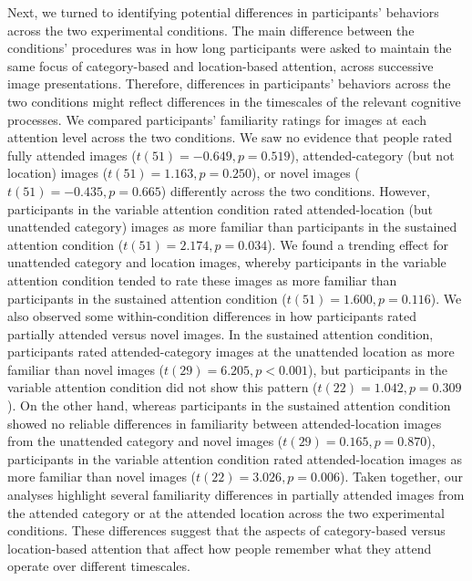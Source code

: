 \documentclass[english]{article}
\begin{document}
Next, we turned to identifying potential differences in participants' behaviors
across the two experimental conditions. The main difference between the
conditions' procedures was in how long participants were asked to maintain the
same focus of category-based and location-based attention, across successive
image presentations. Therefore, differences in participants' behaviors across
the two conditions might reflect differences in the timescales of the relevant
cognitive processes. We compared participants' familiarity ratings for images
at each attention level across the two conditions. We saw no evidence that
people rated fully attended images ($t(51) = -0.649, p = 0.519$),
attended-category (but not location) images ($t(51) = 1.163, p = 0.250$), or
novel images ($t(51) = -0.435, p = 0.665$) differently across the two
conditions. However, participants in the variable attention condition rated
attended-location (but unattended category) images as more familiar than
participants in the sustained attention condition ($t(51) = 2.174, p = 0.034$).
We found a trending effect for unattended category and location images, whereby
participants in the variable attention condition tended to rate these images as
more familiar than participants in the sustained attention condition ($t(51) =
1.600, p = 0.116$). We also observed some within-condition differences in how
participants rated partially attended versus novel images. In the sustained
attention condition, participants rated attended-category images at the
unattended location as more familiar than novel images ($t(29) = 6.205, p <
0.001$), but participants in the variable attention condition did not show this
pattern ($t(22) = 1.042, p = 0.309$). On the other hand, whereas participants
in the sustained attention condition showed no reliable differences in
familiarity between attended-location images from the unattended category and
novel images ($t(29) = 0.165, p = 0.870$), participants in the variable
attention condition rated attended-location images as more familiar than novel
images ($t(22) = 3.026, p = 0.006$). Taken together, our analyses highlight
several familiarity differences in partially attended images from the attended
category or at the attended location across the two experimental conditions.
These differences suggest that the aspects of category-based versus
location-based attention that affect how people remember what they attend
operate over different timescales.
\end{document}
